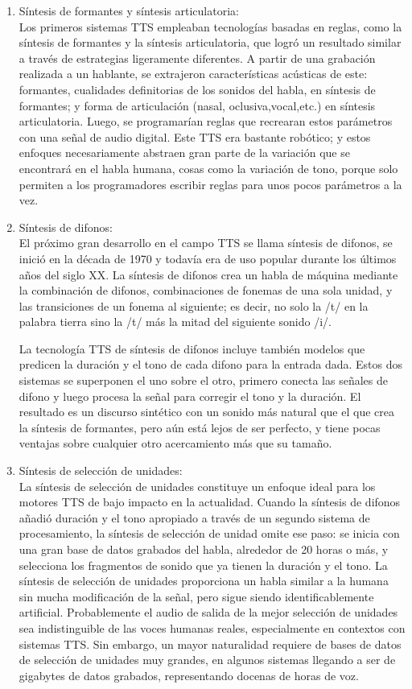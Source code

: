 \begin{enumerate}
	\item  Síntesis de formantes y síntesis articulatoria: \\Los primeros sistemas TTS empleaban tecnologías basadas en reglas, como la síntesis de formantes y la síntesis articulatoria, que logró un resultado similar a través de estrategias ligeramente diferentes. A partir de una grabación realizada a un hablante, se extrajeron características acústicas de este: formantes, cualidades definitorias de los sonidos del habla, en síntesis de formantes; y forma de articulación (nasal, oclusiva,vocal,etc.) en síntesis articulatoria. Luego, se programarían reglas que recrearan estos parámetros con una señal de audio digital. Este TTS era bastante robótico; y estos enfoques necesariamente abstraen gran parte de la variación que se encontrará en el habla humana, cosas como la variación de tono, porque solo permiten a los programadores escribir reglas para unos pocos parámetros a la vez.
	
	\item Síntesis de difonos: \\ El próximo gran desarrollo en el campo TTS se llama síntesis de difonos, se inició en la década de 1970 y todavía era de uso popular durante los últimos años del siglo XX. La síntesis de difonos crea  un habla de máquina mediante la combinación de difonos, combinaciones de fonemas de una sola unidad, y las transiciones de un fonema al siguiente; es decir, no solo la /t/ en la palabra tierra sino la /t/ más la mitad del siguiente sonido /i/. 
	
	La tecnología TTS de síntesis de difonos incluye también modelos que predicen la duración y el tono de cada difono para la entrada dada. Estos dos sistemas se superponen el uno sobre el otro, primero conecta las señales de difono y luego procesa la señal para corregir el tono y la duración. El resultado es un discurso  sintético con un sonido más natural que el que crea la síntesis de formantes, pero aún está lejos de ser perfecto, y tiene pocas ventajas sobre cualquier otro acercamiento más que su tamaño. 
	
	\item Síntesis de selección de unidades: \\ La síntesis de selección de unidades constituye un enfoque ideal para los motores TTS de bajo impacto en la actualidad. Cuando la síntesis de difonos añadió duración y el tono apropiado a través de un segundo sistema de procesamiento, la síntesis de selección de unidad omite ese paso: se inicia con una gran base de datos grabados del habla, alrededor de 20 horas o más, y selecciona los fragmentos de sonido que ya tienen la duración y el tono. La síntesis de selección de unidades proporciona un habla similar a la humana sin mucha modificación de la señal, pero sigue siendo identificablemente artificial. Probablemente el audio de salida de la mejor selección de unidades sea indistinguible de las voces humanas reales, especialmente en contextos con sistemas TTS. Sin embargo, un mayor naturalidad requiere de bases de datos de selección de unidades muy grandes, en algunos sistemas llegando a ser de gigabytes de datos grabados, representando docenas de horas de voz. 
	

\end{enumerate}
